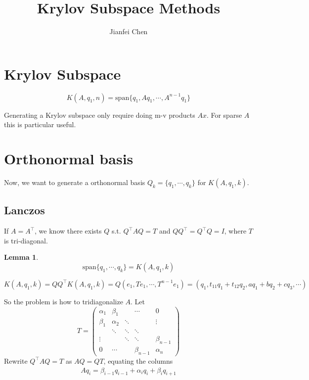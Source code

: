 \documentclass{article}
\title{Krylov Subspace Methods}
\author{Jianfei Chen}
\newtheorem{lemma}[theorem]{Lemma}
\newenvironment{proof}[1][Proof]{\begin{trivlist}
\item[\hskip \labelsep {\bfseries #1}]}{\end{trivlist}}
\newenvironment{definition}[1][Definition]{\begin{trivlist}
\item[\hskip \labelsep {\bfseries #1}]}{\end{trivlist}}
\newenvironment{remark}[1][Remark]{\begin{trivlist}
\item[\hskip \labelsep {\bfseries #1}]}{\end{trivlist}}
\newcommand{\qed}{\nobreak \ifvmode \relax \else
      \ifdim\lastskip<1.5em \hskip-\lastskip
      \hskip1.5em plus0em minus0.5em \fi \nobreak
      \vrule height0.75em width0.5em depth0.25em\fi}
\newcommand{\vspan}[1]{\textrm{span}\{#1\}}
\begin{document}
\maketitle

\section{Krylov Subspace}
\begin{definition}
$$K(A, q_1, n) = \vspan{q_1, Aq_1, \cdots, A^{n-1}q_1}$$
\end{definition}

\begin{remark}
Generating a Krylov subspace only require doing m-v products $Ax$. For sparse $A$ this is particular useful.
\end{remark}

\section{Orthonormal basis}
Now, we want to generate a orthonormal basis $Q_k = \{q_1, \cdots, q_k\}$ for $K(A, q_1, k)$.
\subsection{Lanczos}
If $A=A^\top$, we know there exists $Q$ s.t. $Q^\top AQ=T$ and $QQ^\top = Q^\top Q = I$, where $T$ is tri-diagonal.
\begin{lemma}
$$\vspan{q_1, \cdots, q_k} = K(A, q_1, k)$$
\end{lemma}
\begin{proof}
$$K(A, q_1, k) = QQ^\top K(A, q_1, k) = Q(e_1, Te_1, \cdots, T^{n-1} e_1) = (q_1, t_{11}q_1 + t_{12}q_2, a q_1 + b q_2 + cq_3, \cdots)$$
\qed
\end{proof}

So the problem is how to tridiagonalize $A$. Let
$$T = \begin{pmatrix}
\alpha_1    &   \beta_1     &           &   \cdots  & 0         \\
\beta_1     &   \alpha_2    &   \ddots  &           & \vdots    \\
            &   \ddots      &   \ddots  &   \ddots  &           \\
\vdots      &               &   \ddots  &   \ddots  & \beta_{n-1}\\
0           &   \cdots      &           &   \beta_{n-1} & \alpha_n
\end{pmatrix}$$
Rewrite $Q^\top A Q = T$ as $AQ = QT$, equating the columns
\begin{align}
Aq_i = \beta_{i-1}q_{i-1} + \alpha_i q_{i} + \beta_{i} q_{i+1} \label{Schmidt}
\end{align}
\end{document}
